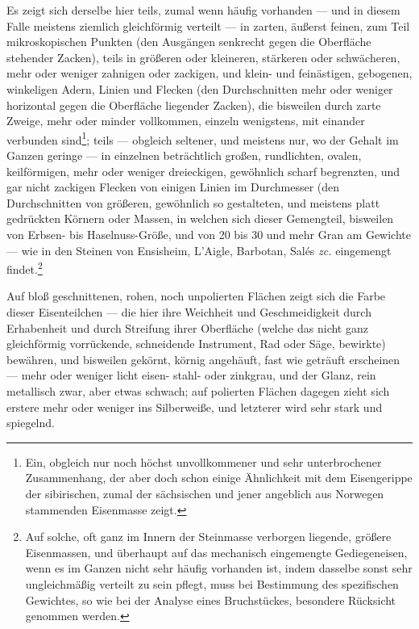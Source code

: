 \documentclass[a4paper, 11pt, oneside, german]{article}
\begin{document}
Es zeigt sich derselbe hier teils, zumal wenn häufig vorhanden --- und in diesem Falle meistens ziemlich gleichförmig verteilt --- in zarten, äußerst feinen, zum Teil mikroskopischen Punkten (den Ausgängen senkrecht gegen die Oberfläche stehender Zacken), teils in größeren oder kleineren, stärkeren oder schwächeren, mehr oder weniger zahnigen oder zackigen, und klein- und feinästigen, gebogenen, winkeligen Adern, Linien und Flecken (den Durchschnitten mehr oder weniger horizontal gegen die Oberfläche liegender Zacken), die bisweilen durch zarte Zweige, mehr oder minder vollkommen, einzeln wenigstens, mit einander verbunden sind\footnote{Ein, obgleich nur noch höchst unvollkommener und sehr unterbrochener Zusammenhang, der aber doch schon einige Ähnlichkeit mit dem Eisengerippe der sibirischen, zumal der sächsischen und jener angeblich aus Norwegen stammenden Eisenmasse zeigt.}; teils --- obgleich seltener, und meistens nur, wo der Gehalt im Ganzen geringe --- in einzelnen beträchtlich großen, rundlichten, ovalen, keilförmigen, mehr oder weniger dreieckigen, gewöhnlich scharf begrenzten, und gar nicht zackigen Flecken von einigen Linien im Durchmesser (den Durchschnitten von größeren, gewöhnlich so gestalteten, und meistens platt gedrückten Körnern oder Massen, in welchen sich dieser Gemengteil, bisweilen von Erbsen- bis Haselnuss-Größe, und von 20 bis 30 und mehr Gran am Gewichte --- wie in den Steinen von Ensisheim, L'Aigle, Barbotan, Salés \emph{zc.} eingemengt findet.\footnote{Auf solche, oft ganz im Innern der Steinmasse verborgen liegende, größere Eisenmassen, und überhaupt auf das mechanisch eingemengte Gediegeneisen, wenn es im Ganzen nicht sehr häufig vorhanden ist, indem dasselbe sonst sehr ungleichmäßig verteilt zu sein pflegt, muss bei Bestimmung des spezifischen Gewichtes, so wie bei der Analyse eines Bruchstückes, besondere Rücksicht genommen werden.}

Auf bloß geschnittenen, rohen, noch unpolierten Flächen zeigt sich die Farbe dieser Eisenteilchen --- die hier ihre Weichheit und Geschmeidigkeit durch Erhabenheit und durch Streifung ihrer Oberfläche (welche das nicht ganz gleichförmig vorrückende, schneidende Instrument, Rad oder Säge, bewirkte) bewähren, und bisweilen gekörnt, körnig angehäuft, fast wie geträuft erscheinen --- mehr oder weniger licht eisen- stahl- oder zinkgrau, und der Glanz, rein metallisch zwar, aber etwas schwach; auf polierten Flächen dagegen zieht sich erstere mehr oder weniger ins Silberweiße, und letzterer wird sehr stark und spiegelnd.
\end{document}
